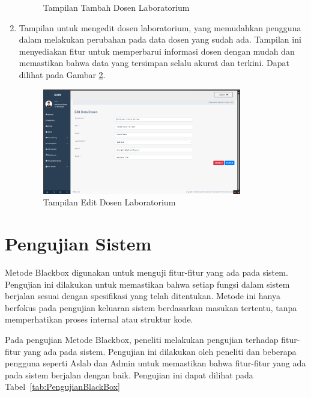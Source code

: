 \begin{enumerate}
\begin{figure}
		      \caption{Tampilan Tambah Dosen Laboratorium}
		      \label{fig:tambah-dosen}
	      \end{figure}
	\item Tampilan untuk mengedit dosen laboratorium, yang memudahkan pengguna dalam melakukan perubahan pada data dosen yang sudah ada. Tampilan ini menyediakan fitur untuk memperbarui informasi dosen dengan mudah dan memastikan bahwa data yang tersimpan selalu akurat dan terkini. Dapat dilihat pada Gambar \ref{fig:edit-dosen}.
	      \begin{figure}
		      \centering
		      \includegraphics[width=0.82\textwidth]{konten/gambar/hasil/edit-dosen.png}
		      \caption{Tampilan Edit Dosen Laboratorium}
		      \label{fig:edit-dosen}
	      \end{figure}
\end{enumerate}

\section{Pengujian Sistem}
Metode Blackbox digunakan untuk menguji fitur-fitur yang ada pada sistem. Pengujian ini dilakukan untuk memastikan bahwa setiap fungsi dalam sistem berjalan sesuai dengan spesifikasi yang telah ditentukan. Metode ini hanya berfokus pada pengujian keluaran sistem berdasarkan masukan tertentu, tanpa memperhatikan proses internal atau struktur kode.

Pada pengujian Metode Blackbox, peneliti melakukan pengujian terhadap fitur-fitur yang ada pada sistem. Pengujian ini dilakukan oleh peneliti dan beberapa pengguna seperti Aslab dan Admin untuk memastikan bahwa fitur-fitur yang ada pada sistem berjalan dengan baik. Pengujian ini dapat dilihat pada Tabel~\ref{tab:PengujianBlackBox}

